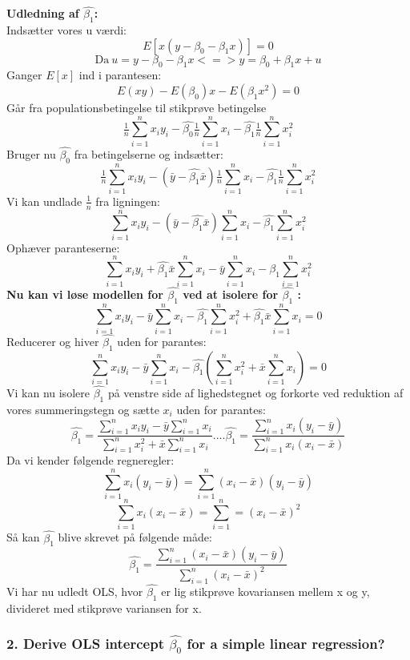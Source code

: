 \documentclass[
  10pt,
]{article}
\begin{document}
\textbf{Udledning af $\hat{\beta_1}$:}\\
Indsætter vores u værdi: \[E[x(y-\beta_0-\beta_1x)]=0\]
\[\text{Da}\ u=y-\beta_0-\beta_1x <=> y=\beta_0+\beta_1x+u  \] Ganger
\(E[x]\) ind i parantesen: \[E(xy)-E(\beta_0)x-E(\beta_1x^2)=0 \] Går
fra populationsbetingelse til stikprøve betingelse
\[\tfrac{1}{n}\sum\limits_{i=1}^n x_iy_i-\hat{\beta_0}\tfrac{1}{n}\sum\limits_{i=1}^nx_i-\hat{\beta_1}\tfrac{1}{n}\sum\limits_{i=1}^nx_i^2\]
Bruger nu \(\hat{\beta_0}\) fra betingelserne og indsætter:
\[\tfrac{1}{n}\sum\limits_{i=1}^n x_iy_i-(\bar{y}-\hat{\beta_1}\bar{x})\tfrac{1}{n}\sum\limits_{i=1}^nx_i-\hat{\beta_1}\tfrac{1}{n}\sum\limits_{i=1}^nx_i^2\]
Vi kan undlade \(\frac{1}{n}\) fra ligningen:
\[\sum\limits_{i=1}^n x_iy_i-(\bar{y}-\hat{\beta_1}\bar{x})\sum\limits_{i=1}^nx_i-\hat{\beta_1}\sum\limits_{i=1}^nx_i^2\]
Ophæver paranteserne:
\[\sum\limits_{i=1}^n x_iy_i+\hat{\beta_1}\bar{x}\sum\limits_{i=1}^nx_i-\bar{y}\sum\limits_{i=1}^nx_i-\hat{\beta_1}\sum\limits_{i=1}^nx_i^2\]
\textbf{Nu kan vi løse modellen for $\hat{\beta_1}$ ved at isolere for $\hat{\beta_1}$ :}
\[\sum\limits_{i=1}^nx_iy_i-\bar{y}\sum\limits_{i=1}^n x_i-\hat{\beta_1}\sum\limits_{i=1}^n x_i^2+\hat{\beta_1}\bar{x}\sum\limits_{i=1}^nx_i = 0\]
Reducerer og hiver \(\hat{\beta_1}\) uden for parantes:
\[\sum\limits_{i=1}^nx_iy_i-\bar{y}\sum\limits_{i=1}^n x_i-\hat{\beta_1}(\sum\limits_{i=1}^n x_i^2+\bar{x}\sum\limits_{i=1}^nx_i) = 0\]
Vi kan nu isolere \(\hat{\beta_1}\) på venstre side af lighedstegnet og
forkorte ved reduktion af vores summeringstegn og sætte \(x_i\) uden for
parantes:
\[\hat{\beta_1}= \frac{\sum\limits_{i=1}^nx_iy_i-\bar{y}\sum\limits_{i=1}^n x_i}{\sum\limits_{i=1}^n x_i^2+\bar{x}\sum\limits_{i=1}^nx_i}....\hat{\beta_1}= \frac{\sum\limits_{i=1}^nx_i(y_i-\bar{y})}{\sum\limits_{i=1}^n x_i(x_i-\bar{x})} \]
Da vi kender følgende regneregler:
\[\sum\limits_{i=1}^nx_i(y_i-\bar{y})=\sum\limits_{i=1}^n(x_i-\bar{x})(y_i-\bar{y}) \tag{a}\]
\[\sum\limits_{i=1}^nx_i(x_i-\bar{x})=\sum\limits_{i=1}^n=(x_i-\bar{x})^2 \tag{b} \]
Så kan \(\hat{\beta_1}\) blive skrevet på følgende måde:
\[\hat{\beta_1}= \frac{\sum\limits_{i=1}^n(x_i-\bar{x})(y_i-\bar{y})}{\sum\limits_{i=1}^n(x_i-\bar{x})^2}\]
Vi har nu udledt OLS, hvor \(\hat{\beta_1}\) er lig stikprøve
kovariansen mellem x og y, divideret med stikprøve variansen for x.
\newpage

\hypertarget{derive-ols-intercept-hatbeta_0-for-a-simple-linear-regression}{%
\subsubsection{\texorpdfstring{2. Derive OLS intercept \(\hat{\beta_0}\)
for a simple linear
regression?}{2. Derive OLS intercept \textbackslash hat\{\textbackslash beta\_0\} for a simple linear regression?}}\label{derive-ols-intercept-hatbeta_0-for-a-simple-linear-regression}}
\end{document}
